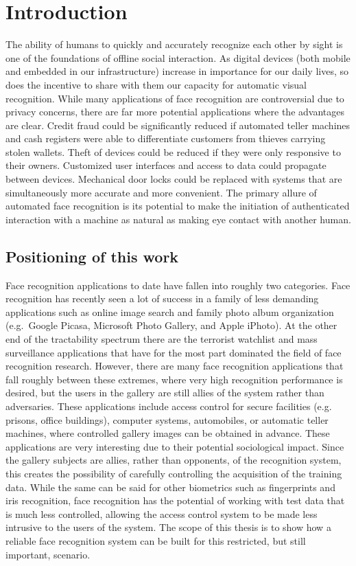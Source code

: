 \chapter{Introduction}
\label{chap:introduction}

The ability of humans to quickly and accurately recognize each other by sight
is one of the foundations of offline social interaction.  As digital devices
(both mobile and embedded in our infrastructure) increase in importance for our
daily lives, so does the incentive to share with them our capacity for
automatic visual recognition.  While many applications of face recognition are
controversial due to privacy concerns, there are far more potential
applications where the advantages are clear.  Credit fraud could be
significantly reduced if automated teller machines and cash registers were able
to differentiate customers from thieves carrying stolen wallets.  Theft of
devices could be reduced if they were only responsive to their owners.
Customized user interfaces and access to data could propagate between devices.
Mechanical door locks could be replaced with systems that are simultaneously
more accurate and more convenient.  The primary allure of
automated face recognition is its potential to make the initiation of
authenticated interaction with a machine as natural as making eye contact with
another human.

\section{Positioning of this work} Face recognition applications to date have
fallen into roughly two categories.  Face recognition has recently seen a lot
of success in a family of less demanding applications such as online image
search and family photo album organization (e.g.\ Google Picasa, Microsoft
Photo Gallery, and Apple iPhoto). At the other end of the tractability spectrum
there are the terrorist watchlist and mass surveillance applications that have
for the most part dominated the field of face recognition research.  However,
there are many face recognition applications that fall roughly between these
extremes, where very high recognition performance is desired, but the users in
the gallery are still allies of the system rather than adversaries.  These
applications include access control for secure facilities (e.g. prisons,
office buildings), computer systems, automobiles, or automatic teller machines,
where controlled gallery images can be obtained in advance.  These applications
are very interesting due to their potential sociological impact.  Since the
gallery subjects are allies, rather than opponents, of the recognition system,
this creates the possibility of carefully controlling the acquisition of the
training data. While the same can be said for other biometrics such as
fingerprints and iris recognition, face recognition has the potential of
working with test data that is much less controlled, allowing the access
control system to be made less intrusive to the users of the system.  The scope
of this thesis is to show how a reliable face recognition system can be built
for this restricted, but still important, scenario.  


